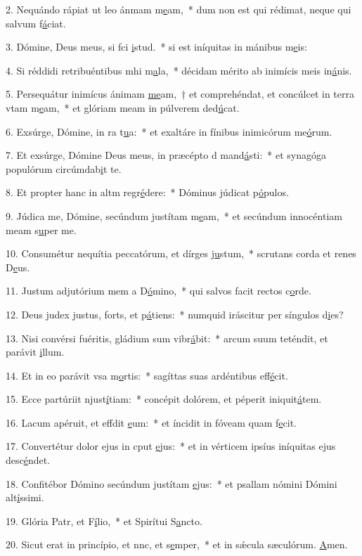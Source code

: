 2. Nequándo rápiat ut leo ánmam m\uline{e}am,~* dum non est qui rédimat, neque qui salvum f\uline{á}ciat.\par 
3. Dómine, Deus meus, si fci \uline{i}stud.~* si est iníquitas in mánibus m\uline{e}is:\par 
4. Si réddidi retribuéntibus mhi m\uline{a}la,~* décidam mérito ab inimícis meis in\uline{á}nis.\par 
5. Persequátur inimícus ánimam \uline{me}am,~† et comprehéndat, et concúlcet in terra vtam m\uline{e}am,~* et glóriam meam in púlverem ded\uline{ú}cat.\par 
6. Exsúrge, Dómine, in ra t\uline{u}a:~* et exaltáre in fínibus inimicórum me\uline{ó}rum.\par 
7. Et exsúrge, Dómine Deus meus, in præcépto d mand\uline{á}sti:~* et synagóga populórum circúmdab\uline{i}t te.\par 
8. Et propter hanc in altm regr\uline{é}dere:~* Dóminus júdicat p\uline{ó}pulos.\par 
9. Júdica me, Dómine, secúndum justítam m\uline{e}am,~* et secúndum innocéntiam meam s\uline{u}per me.\par 
10. Consumétur nequítia peccatórum, et dírges j\uline{u}stum,~* scrutans corda et renes D\uline{e}us.\par 
11. Justum adjutórium mem a D\uline{ó}mino,~* qui salvos facit rectos c\uline{o}rde.\par 
12. Deus judex justus, forts, et p\uline{á}tiens:~* numquid iráscitur per síngulos d\uline{i}es?\par 
13. Nisi convérsi fuéritis, gládium sum vibr\uline{á}bit:~* arcum suum teténdit, et parávit \uline{i}llum.\par 
14. Et in eo parávit vsa m\uline{o}rtis:~* sagíttas suas ardéntibus eff\uline{é}cit.\par 
15. Ecce partúriit njust\uline{í}tiam:~* concépit dolórem, et péperit iniquit\uline{á}tem.\par 
16. Lacum apéruit, et effdit \uline{e}um:~* et íncidit in fóveam quam f\uline{e}cit.\par 
17. Convertétur dolor ejus in cput \uline{e}jus:~* et in vérticem ipsíus iníquitas ejus desc\uline{é}ndet.\par 
18. Confitébor Dómino secúndum justítam \uline{e}jus:~* et psallam nómini Dómini alt\uline{í}ssimi.\par 
19. Glória Patr, et F\uline{í}lio,~* et Spirítui S\uline{a}ncto.\par 
20. Sicut erat in princípio, et nnc, et s\uline{e}mper,~* et in sǽcula sæculórum. \uline{A}men.\par 
